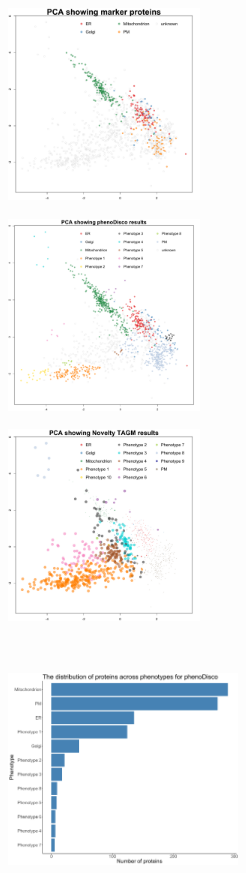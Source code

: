 \documentclass[12pt,english]{article}
\begin{document}
\begin{figure}
	\begin{subfigure}[t]{0.33\textwidth}
		\centering
		\includegraphics[height=2in]{pcaMarkershek}
		\caption{}
	\end{subfigure}%
	\begin{subfigure}[t]{0.33\textwidth}
		\centering
		\includegraphics[height=2in]{pcaPDhek}
		\caption{}
	\end{subfigure}%
	\begin{subfigure}[t]{0.33\textwidth}
		\centering
		\includegraphics[height=2in]{pcaTAGMhek}
		\caption{}
	\end{subfigure}
~
	\begin{subfigure}[t]{0.5\textwidth}
		\centering
		\includegraphics[height=2in]{phenodiscodist}

\end{subfigure}
\end{figure}
\end{document}

